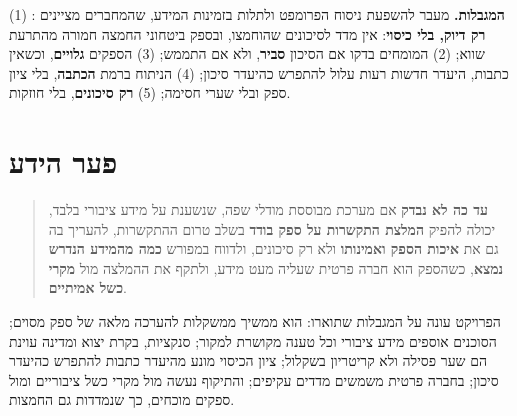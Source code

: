 \textbf{המגבלות.} מעבר להשפעת ניסוח הפרומפט ולתלות בזמינות המידע, שהמחברים מציינים \cite{zhao2025}: (1) \textbf{רק דיוק, בלי כיסוי}: אין מדד לסיכונים שהוחמצו, ובספק ביטחוני החמצה חמורה מהתרעת שווא; (2) המומחים בדקו אם הסיכון \textbf{סביר}, ולא אם התממש; (3) הספקים \textbf{גלויים}, וכשאין כתבות, היעדר חדשות רעות עלול להתפרש כהיעדר סיכון; (4) הניתוח ברמת \textbf{הכתבה}, בלי ציון ספק ובלי שערי חסימה; (5) \textbf{רק סיכונים}, בלי חוזקות.

\section{פער הידע}\label{sec:gap}

\begin{quote}
\textbf{עד כה לא נבדק} אם מערכת מבוססת מודלי שפה, שנשענת על מידע ציבורי בלבד, יכולה להפיק \textbf{המלצת התקשרות על ספק בודד} בשלב טרום ההתקשרות, להעריך בה גם את \textbf{איכות הספק ואמינותו} ולא רק סיכונים, ולדווח במפורש \textbf{כמה מהמידע הנדרש נמצא}, כשהספק הוא חברה פרטית שעליה מעט מידע, ולתקף את ההמלצה מול \textbf{מקרי כשל אמיתיים}.
\end{quote}

הפרויקט עונה על המגבלות שתוארו: הוא ממשיך ממשקלות להערכה מלאה של ספק מסוים; הסוכנים אוספים מידע ציבורי וכל טענה מקושרת למקור; סנקציות, בקרת יצוא ומדינה עוינת הם שער פסילה ולא קריטריון בשקלול; ציון הכיסוי מונע מהיעדר כתבות להתפרש כהיעדר סיכון; בחברה פרטית משמשים מדדים עקיפים; והתיקוף נעשה מול מקרי כשל ציבוריים ומול ספקים מוכחים, כך שנמדדות גם החמצות.

